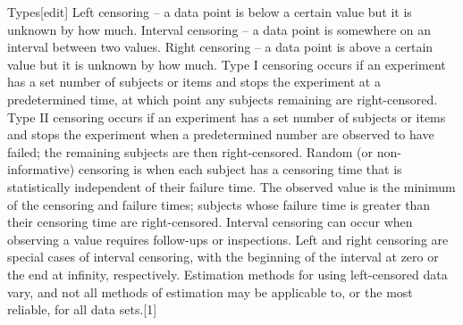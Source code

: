 Types[edit]
Left censoring – a data point is below a certain value but it is unknown by how much.
Interval censoring – a data point is somewhere on an interval between two values.
Right censoring – a data point is above a certain value but it is unknown by how much.
Type I censoring occurs if an experiment has a set number of subjects or items and stops the experiment at a predetermined time, at which point any subjects remaining are right-censored.
Type II censoring occurs if an experiment has a set number of subjects or items and stops the experiment when a predetermined number are observed to have failed; the remaining subjects are then right-censored.
Random (or non-informative) censoring is when each subject has a censoring time that is statistically independent of their failure time. The observed value is the minimum of the censoring and failure times; subjects whose failure time is greater than their censoring time are right-censored.
Interval censoring can occur when observing a value requires follow-ups or inspections. Left and right censoring are special cases of interval censoring, with the beginning of the interval at zero or the end at infinity, respectively.
Estimation methods for using left-censored data vary, and not all methods of estimation may be applicable to, or the most reliable, for all data sets.[1]

